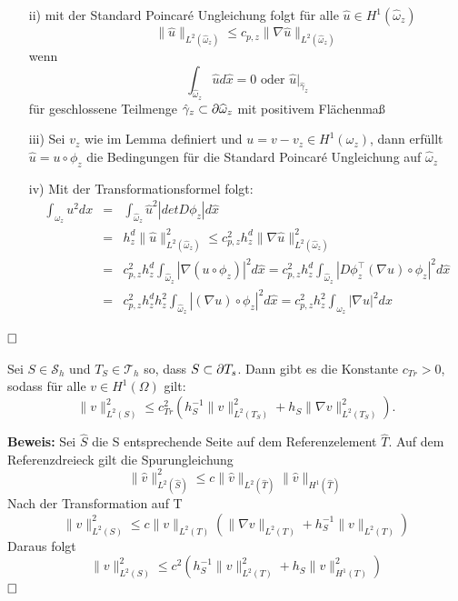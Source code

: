 \begin{itemize}
	\item[ii)] mit der Standard Poincaré Ungleichung folgt für alle $\widehat{u}\in H^1(\widehat{\omega}_z)$
	\[
	\|\widehat{u}\|_{L^2(\widehat{\omega}_z)} \leq c_{p,z}\|\nabla \widehat{u}\|_{L^2(\widehat{\omega}_z)}
	\]
	wenn \[ \int_{\widehat{\omega}_z}\widehat{u}d\hat{x}=0 \text{ oder }\widehat{u}|_{\hat{\gamma}_z}
	\]
	für geschlossene Teilmenge ${\hat{\gamma}_z} \subset \partial \widehat{\omega}_z$ mit positivem Flächenmaß
	\item[iii)] Sei $v_z$ wie im Lemma definiert und $u= v-v_z\in H^1(\omega_z)$, dann erfüllt $\widehat{u} = u \circ \phi_z$ die Bedingungen für die Standard Poincaré Ungleichung auf $\widehat{\omega}_z$
	\item[iv)] Mit der Transformationsformel folgt:
	\begin{eqnarray*}
		\int_{\omega_z} u^2dx&=& \int_{\widehat{\omega}_z} \widehat{u}^2 | detD\phi_z|d\hat{x} \\
		&=& h_z^d\|\widehat{u}\|^2_{L^2(\widehat{\omega}_z)} \leq c^2_{p,z}h^d_z\|\nabla \widehat{u}\|^2_{L^2(\widehat{\omega}_z)} \\
		&=&c^2_{p,z}h^d_z\int_{\widehat{\omega}_z}| \nabla (u\circ\phi_z)|^2 d\hat{x} = c^2_{p,z}h^d_z \int_{\widehat{\omega}_z}|D\phi_z^\top(\nabla u)\circ\phi_z|^2 d\hat{x} \\
		&=& c^2_{p,z}h^d_zh^2_z\int_{\widehat{\omega}_z}|(\nabla u)\circ\phi_z|^2d\hat{x} 
		=c^2_{p,z}h^2_z\int_{\omega_z}|\nabla u|^2dx
	\end{eqnarray*} 
\end{itemize}
$\hfill \Box$

\begin{lemma}
	Sei $S \in  \mathcal{S}_h$ und $T_S \in \mathscr{T}_h$ so, dass $S \subset \partial T_s$. Dann
	gibt es die Konstante $c_{Tr} > 0$, sodass für alle $v\in H^1(\Omega)$ gilt:
	\[
	\|v\|^2_{L^2(S)} \leq c^2_{Tr}(h_S^{-1}\|v\|^2_{L^2(T_S)}+h_S\|\nabla v\|^2_{L^2(T_S)}).
	\]
\end{lemma}
\textbf{Beweis:}
Sei $\hat{S}$ die S entsprechende Seite auf dem Referenzelement $\hat{T}$. Auf dem Referenzdreieck gilt die Spurungleichung
\[
\|\hat{v}\|^2_{L^2(\hat{S})} \leq c\|\hat{v}\|_{L^2(\hat{T})}\|\hat{v}\|_{H^1(\hat{T})}
\]
Nach der Transformation auf T
\[
\|v\|^2_{L^2(S)} \leq c\|v\|_{L^2(T)}(\|\nabla v\|_{L^2(T)}+h_S^{-1}\|v\|_{L^2(T)})
\]
Daraus folgt
\[
\|v\|^2_{L^2(S)} \leq c^2(h_S^{-1}\|v\|^2_{L^2(T)}+h_S\|v\|^2_{H^1(T)})
\]
$\hfill \Box$
